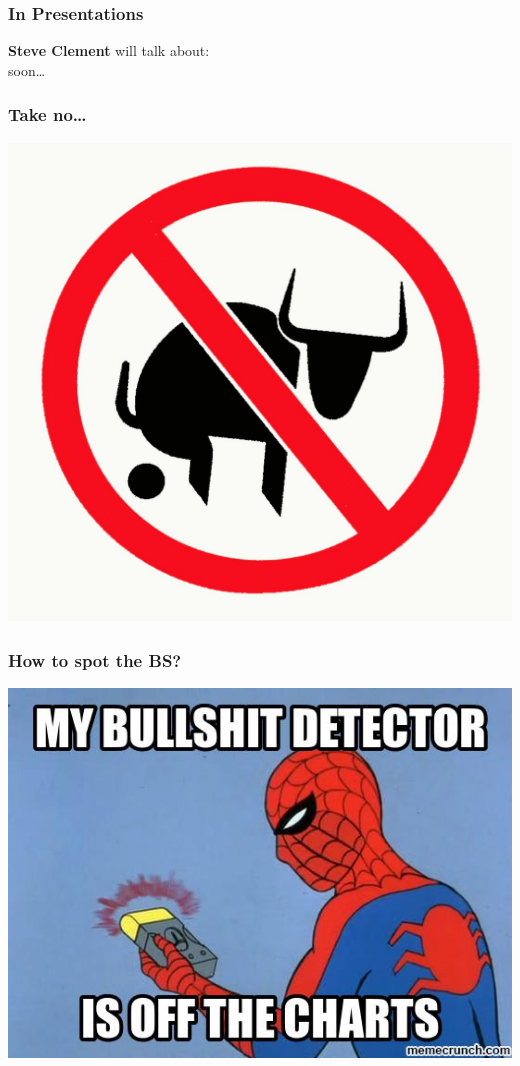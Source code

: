 \documentclass[a4paper]{beamer}
\begin{document}
\begin{frame}
\frametitle{In Presentations} 
{\bf Steve Clement} will talk about: 
\\
soon\ldots
\end{frame}

\begin{frame}
\frametitle{Take no\ldots}
\begin{center}
\includegraphics[scale=0.40]{img/01-no-bullshit.jpg}
\end{center}
\end{frame}

\begin{frame}
\frametitle{How to spot the BS?}
\begin{center}
\includegraphics[scale=0.60]{img/image.jpg}
\end{center}
\end{frame}
\end{document}
